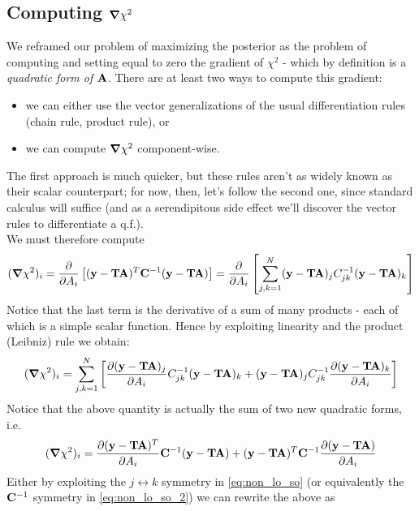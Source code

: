 \documentclass[a4paper]{article}
\newcommand{\mat}[1]{\vb{#1}}
\newcommand{\quadre}[1]{\left[ {#1} \right]}
\begin{document}
\subsection{Computing $\grad\chi^2$}
We reframed our problem of maximizing the posterior as the problem of computing and setting equal to zero the gradient of $\chi^2$ - which by definition is a \emph{quadratic form of $\vb{A}$}.
There are at least two ways to compute this gradient:
\begin{itemize}
    \item we can either use the vector generalizations of the usual differentiation rules (chain rule, product rule), or
    \item we can compute $\grad\chi^2$ component-wise.
\end{itemize}
The first approach is much quicker, but these rules aren't as widely known as their scalar counterpart; for now, then, let's follow the second one, since standard calculus will suffice (and as a serendipitous side effect we'll discover the vector rules to differentiate a q.f.).\\
We must therefore compute
\begin{equation*}
    (\grad\chi^2)_i = \pdv{A_i}\quadre{(\vb{y}-\mat{T}\vb{A})^T \mat{C}^{-1} (\vb{y}-\mat{T}\vb{A})} = \pdv{A_i} \quadre{\sum_{j,k=1}^N  (\vb{y}-\mat{T}\vb{A})_j C_{jk}^{-1}(\vb{y}-\mat{T}\vb{A})_k}
\end{equation*}
Notice that the last term is the derivative of a sum of many products - each of which is a simple scalar function. Hence by exploiting linearity and the product (Leibniz) rule we obtain:
\begin{equation}
\label{eq:non_lo_so}
    (\grad\chi^2)_i = \sum_{j,k=1}^N \quadre{\pdv{(\vb{y}-\mat{T}\vb{A})_j}{A_i} C_{jk}^{-1} (\vb{y}-\mat{T}\vb{A})_k + (\vb{y}-\mat{T}\vb{A})_j C_{jk}^{-1} \pdv{(\vb{y}-\mat{T}\vb{A})_k}{A_i}}
\end{equation}
Notice that the above quantity is actually the sum of two new quadratic forms, i.e.
\begin{equation}
\label{eq:non_lo_so_2}
    (\grad\chi^2)_i = \pdv{(\vb{y}-\mat{T}\vb{A})^T}{A_i} \mat{C}^{-1}(\vb{y}-\mat{T}\vb{A}) + (\vb{y}-\mat{T}\vb{A})^T \mat{C}^{-1} \pdv{(\vb{y}-\mat{T}\vb{A})}{A_i}
\end{equation}
Either by exploiting the $j\leftrightarrow k$ symmetry in \eqref{eq:non_lo_so} (or equivalently the $\mat{C}^{-1}$ symmetry in \eqref{eq:non_lo_so_2}) we can rewrite the above as
\end{document}
